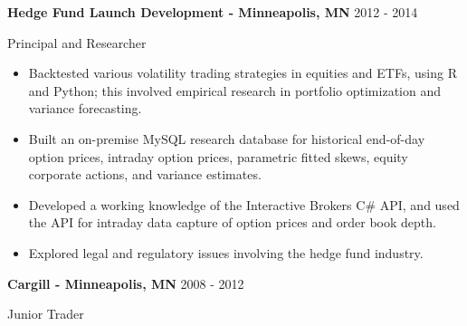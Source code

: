 \documentclass[11pt, a4paper]{awesome-cv}
\begin{document}
\normalsize

\textbf{Hedge Fund Launch Development - Minneapolis, MN } \hfill 2012 -
2014

\vspace{-1ex}

Principal and Researcher

\vspace{-1.5ex}

\small

\begin{itemize}
\item
  Backtested various volatility trading strategies in equities and ETFs,
  using R and Python; this involved empirical research in portfolio
  optimization and variance forecasting. \vspace{-0.5ex}
\item
  Built an on-premise MySQL research database for historical end-of-day
  option prices, intraday option prices, parametric fitted skews, equity
  corporate actions, and variance estimates. \vspace{-0.5ex}
\item
  Developed a working knowledge of the Interactive Brokers C\# API, and
  used the API for intraday data capture of option prices and order book
  depth. \vspace{-0.5ex}
\item
  Explored legal and regulatory issues involving the hedge fund
  industry.
\end{itemize}

\normalsize

\textbf{Cargill - Minneapolis, MN} \hfill 2008 - 2012

\vspace{-1ex}

Junior Trader

\vspace{-1.5ex}

\small
\end{document}
